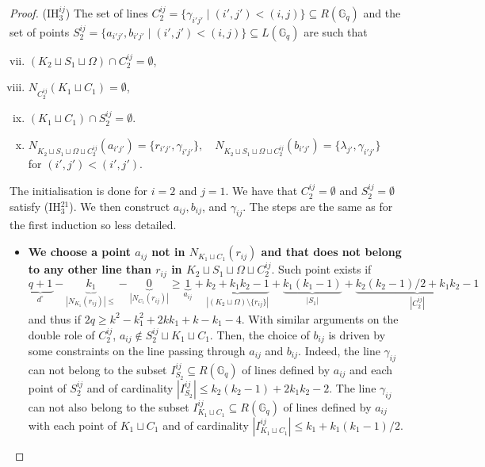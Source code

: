 \documentclass[a4paper,UKenglish,cleveref, autoref, thm-restate]{arxiv}
\newcommand{\ls}{\leqslant}
\newcommand{\gs}{\geqslant}
\newcommand{\G}[1][q]{\mathbb{G}_{#1}}
\begin{document}
\begin{proof}
        (IH$_3^{ij}$) The set of lines $C_2^{ij} = \{\gamma_{i'j'}\mid (i',j')<(i,j)\} \subseteq R(\G)$ and the set of points $S_2^{ij} = \{a_{i'j'}, b_{i'j'}\mid (i',j')<(i,j)\} \subseteq L(\G)$ are such that
        \begin{enumerate}[(i)]
            \setcounter{enumi}{6}
            \item $ \left(K_2 \sqcup S_1 \sqcup \Omega\right) \cap C_2^{ij} = \emptyset$,
            \item $ N_{C_2^{ij}} (K_1 \sqcup C_1) = \emptyset$,
            \item $(K_1 \sqcup C_1) \cap S_2^{ij}  = \emptyset$.
            \item $N_{K_2 \sqcup S_1 \sqcup \Omega \sqcup C_2^{ij}}(a_{i'j'}) = \{r_{i'j'},\gamma_{i'j'}\}, \quad N_{K_2 \sqcup S_1 \sqcup \Omega \sqcup C_2^{ij}}(b_{i'j'}) = \{\lambda_{j'}, \gamma_{i'j'}\}$ \\ for $(i',j') < (i', j')$.
        \end{enumerate}
        The initialisation is done for $i=2$ and $j=1$. We have that 
        $C_2^{ij} = \emptyset$ and $S_2^{ij} = \emptyset$ satisfy (IH$_3^{21}$).
        We then construct $a_{ij}, b_{ij}$, and $\gamma_{ij}$. The steps are the same as for the first induction so less detailed.
        \begin{itemize}
            \item \textbf{We choose a point $a_{ij}$ not in $N_{K_1 \sqcup C_1}(r_{ij})$ and that does not belong to any other line than $r_{ij}$ in $K_2 \sqcup S_1 \sqcup \Omega \sqcup C_2^{ij}$}. Such point exists if \[\underbrace{q+1}_{d^\circ} - \underbrace{k_1}_{|N_{K_1}(r_{ij})|\ls} - \underbrace{0}_{|N_{C_1}(r_{ij})|} \gs \underbrace{1}_{a_{ij}} + \underbrace{k_2 + k_1k_2 - 1}_{|(K_2 \sqcup \Omega)\setminus \{r_{ij}\}|} + \underbrace{k_1(k_1-1)}_{|S_1|} + \underbrace{k_2(k_2-1)/2+k_1k_2 - 1}_{|C_2^{ij}|}\] and thus if $2q \gs k^2 - k_1^2 + 2kk_1 + k - k_1 - 4$. With similar arguments on the double role of $C_2^{ij}$, $a_{ij} \notin S_2^{ij} \sqcup K_1 \sqcup C_1$. Then, the choice of $b_{ij}$ is driven by some constraints on the line passing through $a_{ij}$ and $b_{ij}$. Indeed, the line $\gamma_{ij}$ can not belong  to the subset $I_{S_2}^{ij} \subseteq R(\G)$ of lines defined by $a_{ij}$ and each point of $S_2^{ij}$ and of cardinality $|I_{S_2}^{ij}| \ls k_2(k_2-1) + 2k_1k_2 - 2$. The line $\gamma_{ij}$ can not also belong to the subset $I_{K_1\sqcup C_1}^{ij} \subseteq R(\G)$ of lines defined by $a_{ij}$ with each point of $K_1 \sqcup C_1$ and of cardinality $|I_{K_1\sqcup C_1}^{ij}| \ls k_1 + k_1(k_1-1)/2$.

\end{itemize}
\end{proof}
\end{document}
